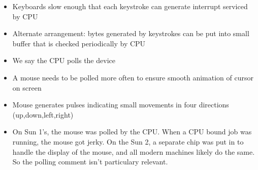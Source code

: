 \begin{frame}[fragile]
\begin{itemize}
\item Keyboards slow enough that each keystroke can generate interrupt
serviced by CPU
\item Alternate arrangement: bytes generated by keystrokes can be put
into small buffer that is checked periodically by CPU
\item We say the CPU polls the device
\item A mouse needs to be polled more often to ensure smooth animation
of cursor on screen
\item Mouse generates pulses indicating small movements in four
directions (up,down,left,right)
\end{itemize}
\BNotes\ifnum{}
\begin{itemize}
\item On Sun 1's, the mouse was polled by the CPU.  When a CPU bound job
	was running, the mouse got jerky.  On the Sun 2, a separate chip was
	put in to handle the display of the mouse, and all modern machines
	likely do the same.  So the polling comment isn't particulary
	relevant.
\end{itemize}
\fi\ENotes
\end{frame}

